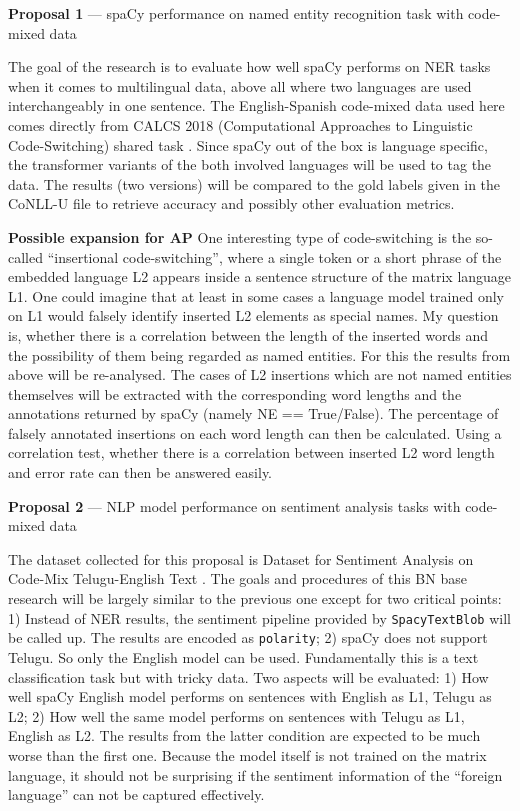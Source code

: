 \documentclass[12pt]{article}
\makeatletter
\DeclareRobustCommand\citep
{\begingroup\NAT@swatrue\let\NAT@ctype\z@\NAT@partrue
    \@ifstar{\NAT@fulltrue\NAT@citetp}{\NAT@fullfalse\NAT@citetp}}
\makeatother
\begin{document}
\noindent \textbf{Proposal 1} --- spaCy performance on named entity recognition task with code-mixed data \bigbreak

The goal of the research is to evaluate how well spaCy performs on NER tasks when it comes to multilingual data, above all where two languages are used interchangeably in one sentence.  The English-Spanish code-mixed data used here comes directly from CALCS 2018 (Computational Approaches to Linguistic Code-Switching) shared task \citep{aguilaretal2018calcs}. Since spaCy out of the box is language specific, the transformer variants of the both involved languages will be used to tag the data. The results (two versions) will be compared to the gold labels given in the CoNLL-U file to retrieve accuracy and possibly other evaluation metrics.

\textbf{Possible expansion for AP} One interesting type of code-switching is the so-called ``insertional code-switching'', where a single token or a short phrase of the embedded language L2 appears inside a sentence structure of the matrix language L1. One could imagine that at least in some cases a language model trained only on L1 would falsely identify inserted L2 elements as special names. My question is, whether there is a correlation between the length of the inserted words and the possibility of them being regarded as named entities. For this the results from above will be re-analysed. The cases of L2 insertions which are not named entities themselves will be extracted with the corresponding word lengths and the annotations returned by spaCy (namely NE == True/False). The percentage of falsely annotated insertions on each word length can then be calculated. Using a correlation test, whether there is a correlation between inserted L2 word length and error rate can then be answered easily.
\vspace{20pt}

\noindent \textbf{Proposal 2} --- NLP model performance on sentiment analysis tasks with code-mixed data \bigbreak

The dataset collected for this proposal is Dataset for Sentiment Analysis on Code-Mix Telugu-English Text \citep{kusampudi2021cssentiment}. The goals and procedures of this BN base research will be largely similar to the previous one except for two critical points: 1) Instead of NER results, the sentiment pipeline provided by \texttt{SpacyTextBlob} will be called up. The results are encoded as \texttt{polarity}; 2) spaCy does not support Telugu. So only the English model can be used. Fundamentally this is a text classification task but with tricky data. Two aspects will be evaluated: 1) How well spaCy English model performs on sentences with English as L1, Telugu as L2; 2) How well the same model performs on sentences with Telugu as L1, English as L2. The results from the latter condition are expected to be much worse than the first one. Because the model itself is not trained on the matrix language, it should not be surprising if the sentiment information of the ``foreign language'' can not be captured effectively.
\end{document}

